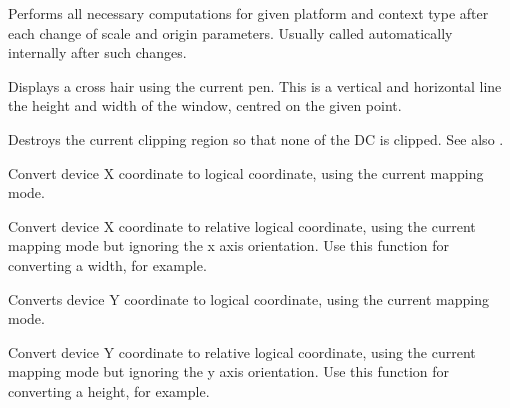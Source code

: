 \label{wxdccomputescaleandorigin}


Performs all necessary computations for given platform and context type
after each change of scale and origin parameters. Usually called automatically 
internally after such changes.


\label{wxdccrosshair}


Displays a cross hair using the current pen. This is a vertical
and horizontal line the height and width of the window, centred
on the given point.


\label{wxdcdestroyclippingregion}


Destroys the current clipping region so that none of the DC is clipped.
See also .


\label{wxdcdevicetologicalx}


Convert device X coordinate to logical coordinate, using the current
mapping mode.


\label{wxdcdevicetologicalxrel}


Convert device X coordinate to relative logical coordinate, using the current
mapping mode but ignoring the x axis orientation.
Use this function for converting a width, for example.


\label{wxdcdevicetologicaly}


Converts device Y coordinate to logical coordinate, using the current
mapping mode.


\label{wxdcdevicetologicalyrel}


Convert device Y coordinate to relative logical coordinate, using the current
mapping mode but ignoring the y axis orientation.
Use this function for converting a height, for example.


